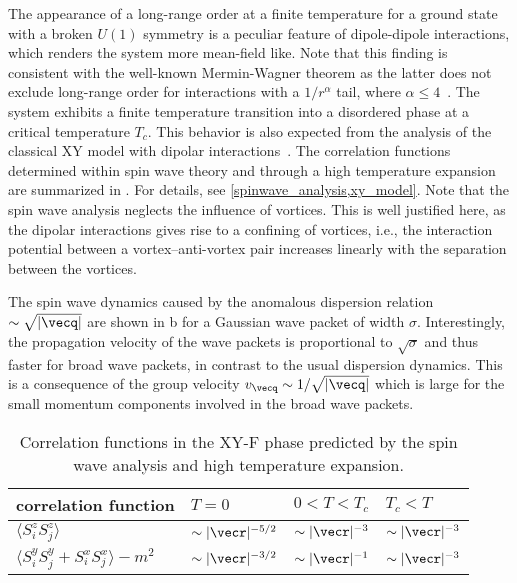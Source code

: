 The appearance of a long-range order at a finite temperature for a ground state with a broken $U(1)$ symmetry is a peculiar feature of dipole-dipole interactions, which renders the system more mean-field like.
Note that this finding is consistent with the well-known Mermin-Wagner theorem as the latter does not exclude long-range order for interactions with a $1/r^\alpha$ tail, where $\alpha \le 4$~\cite{Mermin1966,DeSousa2005}.
The system exhibits a finite temperature transition into a disordered phase at a critical temperature $T_{c}$.
This behavior is also expected from the analysis of the classical XY model with dipolar interactions~\cite{Bruno2001}.
The correlation functions determined within spin wave theory and through a high temperature expansion are summarized in .
For details, see \cref{spinwave_analysis,xy_model}.
Note that the spin wave analysis neglects the influence of vortices.
This is well justified here, as the dipolar interactions gives rise to a confining of vortices, i.e., the interaction potential between a vortex--anti-vortex pair increases linearly with the separation between the vortices.

The spin wave dynamics caused by the anomalous dispersion relation $\sim \sqrt{|{\vecq}|}$ are shown in b for a Gaussian wave packet of width $\sigma$. Interestingly, the propagation velocity of the wave packets is proportional to $\sqrt{\sigma}$ and thus faster for broad wave packets, in contrast to the usual dispersion dynamics. This is a consequence of the group velocity $v_{\vecq} \sim 1/\sqrt{|{\vecq}|}$ which is large for the small momentum components involved in the broad wave packets.

\begin{table}
    \centering
    \begin{tabu} to .8\textwidth {X[1.8]X[c]X[c]X[c]}
        \toprule
        correlation function & $T=0$ & $0 < T < T_{c}$ & $T_{c}< T$ \\
        \midrule
        $ \langle S^{z}_{i} S^{z}_{j}\rangle$  &$ \sim |{\vecr}|^{-5/2}$  & $\sim |{\vecr}|^{-3}$ &  $\sim |{\vecr}|^{-3}$ \\
        $ \langle S^{y}_{i} S^{y}_{j}+ S^{x}_{i} S^{x}_{j}\rangle- m^2$  &$ \sim |{\vecr}|^{-3/2}$ &  $\sim |{\vecr}|^{-1}$ &  $\sim |{\vecr}|^{-3}$ \\
        \bottomrule
    \end{tabu}
    \caption{Correlation functions in the XY-F phase predicted by the spin wave analysis and high temperature expansion.}
\end{table}


